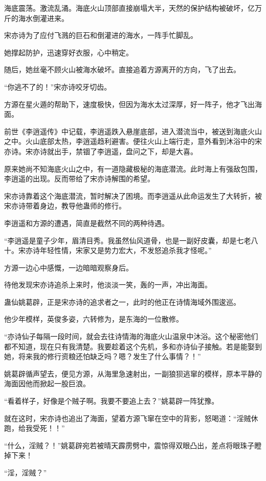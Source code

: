 \begin{this_body}
海底震荡。激流乱涌。海底火山顶部直接崩塌大半，天然的保护结构被破坏，亿万斤的海水倒灌进来。

宋亦诗为了应付飞溅的巨石和倒灌进的海水，一阵手忙脚乱。

她撑起防护，迅速穿好衣服，心中稍定。

随后，她丝毫不顾火山被海水破坏。直接追着方源离开的方向，飞了出去。

“你逃不了的！”宋亦诗咬牙切齿。

方源在星火遁的帮助下，速度极快，但因为海水太过深厚，好一阵子，他才飞出海面。

前世《李逍遥传》中记载，李逍遥跌入悬崖底部，进入潜流当中，被送到海底火山之中。火山底部太热，李逍遥趋利避害。便往火山上端行走，意外看到沐浴中的宋亦诗。宋亦诗就出手，禁锢了李逍遥，盘问之下，却是大喜。

原来她尚不知海底火山之中，有一道隐藏极秘的海底潜流。此时海上有强敌包围，李逍遥的出现。反而带给了宋亦诗解围的希望。

宋亦诗靠着这个海底潜流，暂时解决了困境。而李逍遥从此命运发生了大转折，被宋亦诗带着身边，教导他蛊师的修行。

李逍遥和方源的遭遇，简直是截然不同的两种待遇。

“李逍遥是童子少年，眉清目秀。我虽然仙风道骨，也是一副好皮囊，却是七老八十。宋亦诗年轻性情，宋家又是势力宏大，不发怒追杀我才怪呢。”

方源一边心中感慨，一边暗暗观察身后。

待他发现宋亦诗追杀上来时，他淡淡一笑，轰的一声，冲出海面。

蛊仙姚葛辟，正是宋亦诗的追求者之一，此时的他正在诗情海域外围逡巡。

他少年模样，英俊多姿，六转修为，是东海的一位散修。

“亦诗仙子每隔一段时间，就会去往诗情海的海底火山温泉中沐浴。这个秘密他们都不知道，现在只有我清楚。我要趁着这个先机，多和亦诗仙子接触。若是能娶到她，将来我的修行资粮还怕缺乏吗？嗯？发生了什么事情？！”

姚葛辟循声望去，便见方源，从海里急速射出，一副狼狈逃窜的模样，原本平静的海面因他而掀起一股巨浪。

“看着样子，好像是个贼子啊。我要不要追上去？”姚葛辟一阵犹豫。

就在这时，宋亦诗也追出了海面，望着方源飞窜在空中的背影，怒喝道：“淫贼休跑，给我受死！！”

“什么，淫贼？！”姚葛辟宛若被晴天霹雳劈中，震惊得双眼凸出，差点将眼珠子瞪掉下来！

“淫，淫贼？”


\end{this_body}
